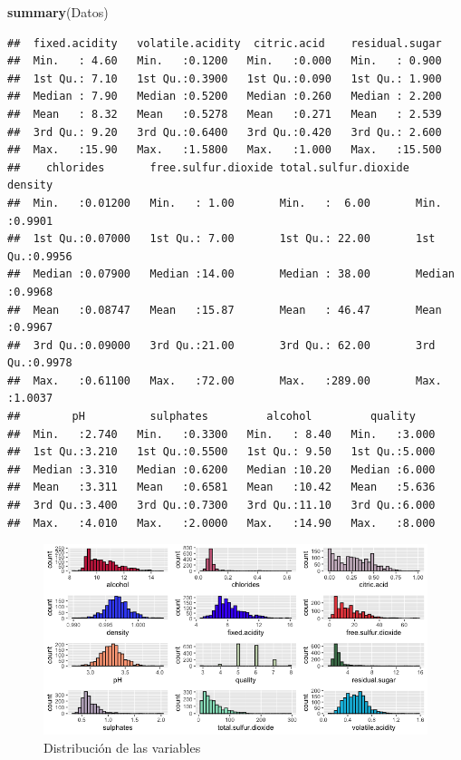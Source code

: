 \documentclass[
]{article}
\newenvironment{Shaded}{\begin{snugshade}}{\end{snugshade}}
\newcommand{\KeywordTok}[1]{\textcolor[rgb]{0.13,0.29,0.53}{\textbf{#1}}}
\newcommand{\NormalTok}[1]{#1}
\begin{document}
\begin{Shaded}
\begin{Highlighting}[]
\KeywordTok{summary}\NormalTok{(Datos)}
\end{Highlighting}
\end{Shaded}

\begin{verbatim}
##  fixed.acidity   volatile.acidity  citric.acid    residual.sugar  
##  Min.   : 4.60   Min.   :0.1200   Min.   :0.000   Min.   : 0.900  
##  1st Qu.: 7.10   1st Qu.:0.3900   1st Qu.:0.090   1st Qu.: 1.900  
##  Median : 7.90   Median :0.5200   Median :0.260   Median : 2.200  
##  Mean   : 8.32   Mean   :0.5278   Mean   :0.271   Mean   : 2.539  
##  3rd Qu.: 9.20   3rd Qu.:0.6400   3rd Qu.:0.420   3rd Qu.: 2.600  
##  Max.   :15.90   Max.   :1.5800   Max.   :1.000   Max.   :15.500  
##    chlorides       free.sulfur.dioxide total.sulfur.dioxide    density      
##  Min.   :0.01200   Min.   : 1.00       Min.   :  6.00       Min.   :0.9901  
##  1st Qu.:0.07000   1st Qu.: 7.00       1st Qu.: 22.00       1st Qu.:0.9956  
##  Median :0.07900   Median :14.00       Median : 38.00       Median :0.9968  
##  Mean   :0.08747   Mean   :15.87       Mean   : 46.47       Mean   :0.9967  
##  3rd Qu.:0.09000   3rd Qu.:21.00       3rd Qu.: 62.00       3rd Qu.:0.9978  
##  Max.   :0.61100   Max.   :72.00       Max.   :289.00       Max.   :1.0037  
##        pH          sulphates         alcohol         quality     
##  Min.   :2.740   Min.   :0.3300   Min.   : 8.40   Min.   :3.000  
##  1st Qu.:3.210   1st Qu.:0.5500   1st Qu.: 9.50   1st Qu.:5.000  
##  Median :3.310   Median :0.6200   Median :10.20   Median :6.000  
##  Mean   :3.311   Mean   :0.6581   Mean   :10.42   Mean   :5.636  
##  3rd Qu.:3.400   3rd Qu.:0.7300   3rd Qu.:11.10   3rd Qu.:6.000  
##  Max.   :4.010   Max.   :2.0000   Max.   :14.90   Max.   :8.000
\end{verbatim}

\begin{figure}
\centering
\includegraphics[width=6.77083in,height=\textheight]{G1.png}
\caption{Distribución de las variables}
\end{figure}
\end{document}
